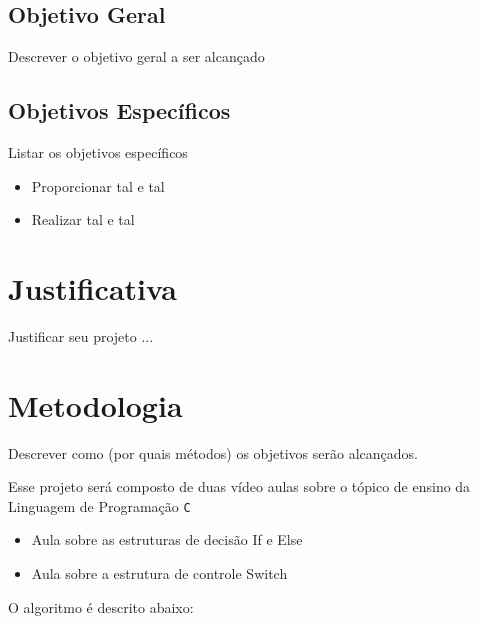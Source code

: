 \documentclass[a4paper,10pt]{article}  %
\begin{document}
 \subsection{Objetivo Geral}

  Descrever o objetivo geral a ser alcançado

 \subsection{Objetivos Específicos}

   Listar os objetivos específicos

\begin{itemize}
 \item Proporcionar tal e tal
 \item Realizar tal e tal
\end{itemize}


\section{Justificativa}

 Justificar seu projeto ...



\section{Metodologia}

  Descrever como (por quais métodos) os objetivos serão alcançados.

   Esse projeto será composto de duas vídeo aulas sobre o tópico de ensino da Linguagem de Programação \texttt{C}

\begin{itemize}

 \item Aula sobre as estruturas de decisão If e Else
 \item Aula sobre a estrutura de controle Switch
\end{itemize}


  O algoritmo é descrito abaixo:


\end{document}
